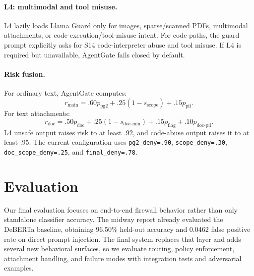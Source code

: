 \documentclass[11pt]{article}
\begin{document}
\paragraph{L4: multimodal and tool misuse.}
L4 lazily loads Llama Guard only for images, sparse/scanned PDFs, multimodal attachments, or code-execution/tool-misuse intent. For code paths, the guard prompt explicitly asks for S14 code-interpreter abuse and tool misuse. If L4 is required but unavailable, AgentGate fails closed by default.

\paragraph{Risk fusion.}
For ordinary text, AgentGate computes:
\begin{equation}
r_{\text{main}} = .60 p_{\text{pg2}} + .25(1-s_{\text{scope}})+ .15 p_{\text{pii}}.
\end{equation}
For text attachments:
\begin{equation}
r_{\text{doc}} = .50 p_{\text{doc}} + .25(1-s_{\text{doc-min}})+.15\rho_{\text{flag}}+.10p_{\text{doc-pii}}.
\end{equation}
L4 unsafe output raises risk to at least .92, and code-abuse output raises it to at least .95. The current configuration uses \texttt{pg2\_deny=.90}, \texttt{scope\_deny=.30}, \texttt{doc\_scope\_deny=.25}, and \texttt{final\_deny=.78}.

\section{Evaluation}

Our final evaluation focuses on end-to-end firewall behavior rather than only standalone classifier accuracy. The midway report already evaluated the DeBERTa baseline, obtaining 96.50\% held-out accuracy and 0.0462 false positive rate on direct prompt injection. The final system replaces that layer and adds several new behavioral surfaces, so we evaluate routing, policy enforcement, attachment handling, and failure modes with integration tests and adversarial examples.
\end{document}
